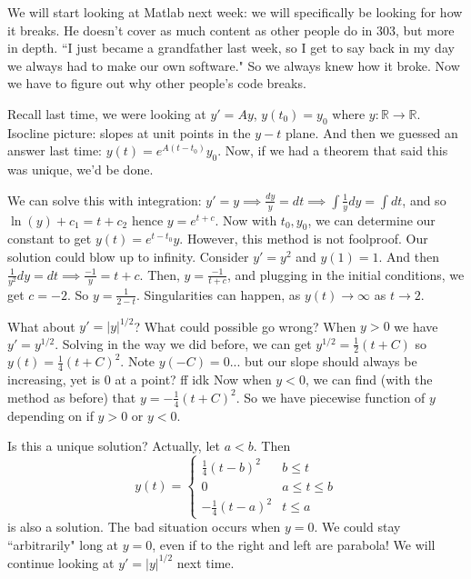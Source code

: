 \documentclass{article}
\theoremstyle{plain}
\theoremstyle{remark}
\newcommand{\R}{{\mathbb R}}
\begin{document}
We will start looking at Matlab next week: we will specifically be looking for how it breaks.
He doesn't cover as much content as other people do in 303, but more in depth.
``I just became a grandfather last week, so I get to say back in my day
we always had to make our own software."
So we always knew how it broke.
Now we have to figure out why other people's code breaks.

Recall last time, we were looking at $y' = Ay$, $y(t_0) = y_0$
where $y \colon \R \to \R$.
Isocline picture: slopes at unit points in the $y-t$ plane.
And then we guessed an answer last time: $y(t) = e^{A(t-t_0)}y_0$.
Now, if we had a theorem that said this was unique, we'd be done.

We can solve this with integration:
$y' = y \implies \frac{dy}{y} = dt \implies \int\frac{1}{y}dy = \int dt$,
and so $\ln(y) + c_1 = t + c_2$ hence $y = e^{t+c}$.
Now with $t_0,y_0$, we can determine our constant to get $y(t) = e^{t-t_0}y$.
However, this method is not foolproof.
Our solution could blow up to infinity.
Consider $y' = y^2$ and $y(1) = 1$.
And then $\frac{1}{y^2}dy = dt \implies \frac{-1}{y} = t+c$.
Then, $y= \frac{-1}{t+c}$, and plugging in the initial conditions, we get
$c = -2$.
So $y = \frac{1}{2-t}$.
Singularities can happen, as $y(t) \to \infty$ as $t \to 2$.

What about $y' = |y|^{1/2}$? What could possible go wrong?
When $y > 0$ we have $y' = y^{1/2}$.
Solving in the way we did before, we can get
$y^{1/2} = \frac12(t+C)$
so $y(t) = \frac{1}{4}(t+C)^2$.
Note $y(-C) = 0$... but our slope should always be increasing,
yet is $0$ at a point? ff idk
Now when $y < 0$, we can find (with the method as before)
that $y= -\frac14(t+C)^2$.
So we have piecewise function of $y$ depending on if $y > 0$ or $y < 0$.

Is this a unique solution?
Actually, let $a < b$. Then
\[
	y(t) = \begin{cases}
		\frac14(t-b)^2 & b \leq t\\
		0 & a \leq t \leq b\\
	-\frac14(t-a)^2 & t \leq a \end{cases}
\]
is also a solution.
The bad situation occurs when $y = 0$.
We could stay ``arbitrarily" long at $y = 0$,
even if to the right and left are parabola!
We will continue looking at $y' = |y|^{1/2}$ next time.
\end{document}
